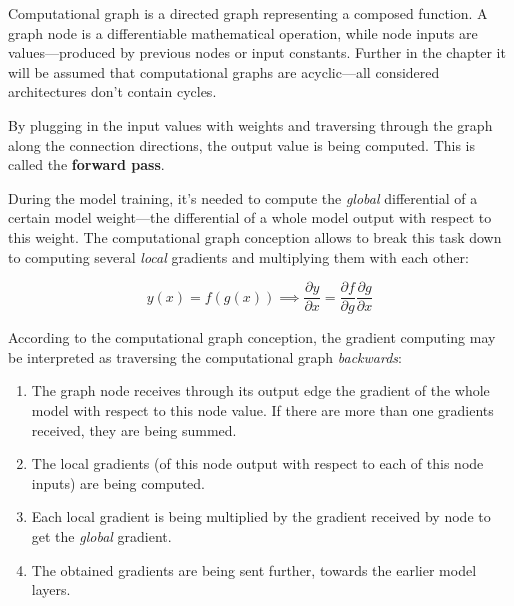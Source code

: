 \documentclass[thesis=B,english]{FITthesis}[2019/12/23]
\begin{document}
	Computational graph is a directed graph representing a composed function. A graph node is a differentiable mathematical operation, while node inputs are values---produced by previous nodes or input constants. Further in the chapter it will be assumed that computational graphs are acyclic---all considered architectures don't contain cycles.
	
	By plugging in the input values with weights and traversing through the graph along the connection directions, the output value is being computed. This is called the \textbf{forward pass}.
	
	During the model training, it's needed to compute the \textit{global} differential of a certain model weight---the differential of a whole model output with respect to this weight. The computational graph conception allows to break this task down to computing several \textit{local} gradients and multiplying them with each other:
	
	\[y(x) = f(g(x)) \implies \frac{\partial y}{\partial x} = \frac{\partial f}{\partial g} \frac{\partial g}{\partial x}\]
	
	According to the computational graph conception, the gradient computing may be interpreted as traversing the computational graph \textit{backwards}:
	\begin{enumerate}
		\item The graph node receives through its output edge the gradient of the whole model with respect to this node value. If there are more than one gradients received, they are being summed.
		\item The local gradients (of this node output with respect to each of this node inputs) are being computed.
		\item Each local gradient is being multiplied by the gradient received by node to get the \textit{global} gradient.
		\item The obtained gradients are being sent further, towards the earlier model layers.
	\end{enumerate}
	
\end{document}
